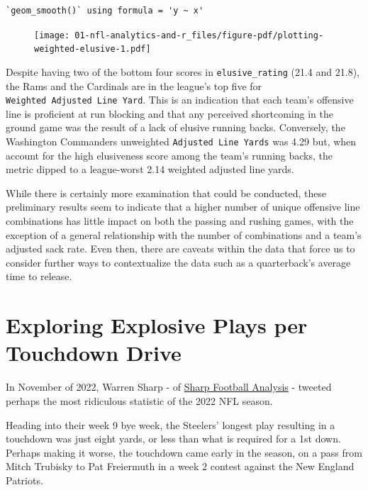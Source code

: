 \documentclass[
  letterpaper,
]{krantz}
\begin{document}
\begin{verbatim}
`geom_smooth()` using formula = 'y ~ x'
\end{verbatim}

\begin{figure}[H]

{\centering \texttt{[image: 01-nfl-analytics-and-r\_files/figure-pdf/plotting-weighted-elusive-1.pdf]}

}

\end{figure}

Despite having two of the bottom four scores in \texttt{elusive\_rating}
(21.4 and 21.8), the Rams and the Cardinals are in the league's top five
for \texttt{Weighted\ Adjusted\ Line\ Yard}. This is an indication that
each team's offensive line is proficient at run blocking and that any
perceived shortcoming in the ground game was the result of a lack of
elusive running backs. Conversely, the Washington Commanders unweighted
\texttt{Adjusted\ Line\ Yards} was 4.29 but, when account for the high
elusiveness score among the team's running backs, the metric dipped to a
league-worst 2.14 weighted adjusted line yards.

While there is certainly more examination that could be conducted, these
preliminary results seem to indicate that a higher number of unique
offensive line combinations has little impact on both the passing and
rushing games, with the exception of a general relationship with the
number of combinations and a team's adjusted sack rate. Even then, there
are caveats within the data that force us to consider further ways to
contextualize the data such as a quarterback's average time to release.

\hypertarget{exploring-explosive-plays-per-touchdown-drive}{%
\section{Exploring Explosive Plays per Touchdown
Drive}\label{exploring-explosive-plays-per-touchdown-drive}}

In November of 2022, Warren Sharp - of
\href{https://www.sharpfootballanalysis.com/}{Sharp Football Analysis} -
tweeted perhaps the most ridiculous statistic of the 2022 NFL season.

Heading into their week 9 bye week, the Steelers' longest play resulting
in a touchdown was just eight yards, or less than what is required for a
1st down. Perhaps making it worse, the touchdown came early in the
season, on a pass from Mitch Trubisky to Pat Freiermuth in a week 2
contest against the New England Patriots.
\end{document}

